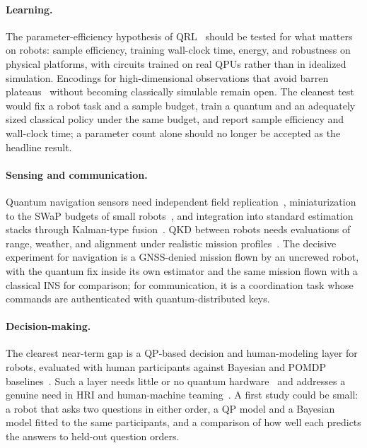 \documentclass[acmsmall,screen,review]{acmart}
\begin{document}
\paragraph{Learning.} The parameter-efficiency hypothesis of QRL~\cite{Hohenfeld2024,Acuto2022} should be tested for what matters on robots: sample efficiency, training wall-clock time, energy, and robustness on physical platforms, with circuits trained on real QPUs rather than in idealized simulation. Encodings for high-dimensional observations that avoid barren plateaus~\cite{Cerezo2021b,Larocca2025} without becoming classically simulable remain open. The cleanest test would fix a robot task and a sample budget, train a quantum and an adequately sized classical policy under the same budget, and report sample efficiency and wall-clock time; a parameter count alone should no longer be accepted as the headline result.

\paragraph{Sensing and communication.} Quantum navigation sensors need independent field replication~\cite{Muradoglu2025}, miniaturization to the SWaP budgets of small robots~\cite{Bongs2019}, and integration into standard estimation stacks through Kalman-type fusion~\cite{Cheiney2018,Wang2021}. QKD between robots needs evaluations of range, weather, and alignment under realistic mission profiles~\cite{Conrad2025}. The decisive experiment for navigation is a GNSS-denied mission flown by an uncrewed robot, with the quantum fix inside its own estimator and the same mission flown with a classical INS for comparison; for communication, it is a coordination task whose commands are authenticated with quantum-distributed keys.

\paragraph{Decision-making.} The clearest near-term gap is a QP-based decision and human-modeling layer for robots, evaluated with human participants against Bayesian and POMDP baselines~\cite{Kurniawati2022,Pothos2022}. Such a layer needs little or no quantum hardware~\cite{Widdows2023} and addresses a genuine need in HRI and human-machine teaming~\cite{Lawless2023,Humr2025}. A first study could be small: a robot that asks two questions in either order, a QP model and a Bayesian model fitted to the same participants, and a comparison of how well each predicts the answers to held-out question orders.
\end{document}
